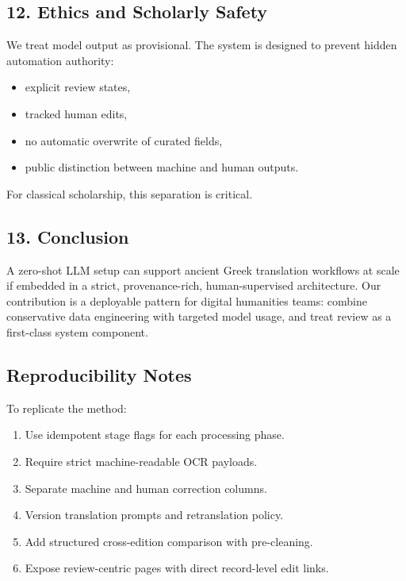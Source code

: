 \documentclass[
]{article}
\providecommand{\tightlist}{%
  \setlength{\itemsep}{0pt}\setlength{\parskip}{0pt}}
\begin{document}
\hypertarget{12-ethics-and-scholarly-safety}{%
\subsection{12. Ethics and Scholarly
Safety}\label{12-ethics-and-scholarly-safety}}

We treat model output as provisional. The system is designed to prevent
hidden automation authority:

\begin{itemize}
\tightlist
\item
  explicit review states,
\item
  tracked human edits,
\item
  no automatic overwrite of curated fields,
\item
  public distinction between machine and human outputs.
\end{itemize}

For classical scholarship, this separation is critical.

\hypertarget{13-conclusion}{%
\subsection{13. Conclusion}\label{13-conclusion}}

A zero-shot LLM setup can support ancient Greek translation workflows at
scale if embedded in a strict, provenance-rich, human-supervised
architecture. Our contribution is a deployable pattern for digital
humanities teams: combine conservative data engineering with targeted
model usage, and treat review as a first-class system component.

\hypertarget{reproducibility-notes}{%
\subsection{Reproducibility Notes}\label{reproducibility-notes}}

To replicate the method:

\begin{enumerate}
\def\labelenumi{\arabic{enumi}.}
\tightlist
\item
  Use idempotent stage flags for each processing phase.
\item
  Require strict machine-readable OCR payloads.
\item
  Separate machine and human correction columns.
\item
  Version translation prompts and retranslation policy.
\item
  Add structured cross-edition comparison with pre-cleaning.
\item
  Expose review-centric pages with direct record-level edit links.
\end{enumerate}
\end{document}
